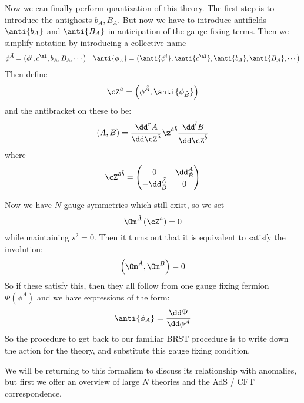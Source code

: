 \documentclass{booc}
\begin{document}
Now we can finally perform quantization of this theory.
The first step is to introduce the antighosts $b_A, B_A$. 
But now we have to introduce antifields $\anti{b_A}$ and $\anti{B_A}$
in anticipation of the gauge fixing terms. 
Then we simplify notation by introducing a collective name
\begin{align}
\phi^{\tilde{A}} = \left( \phi^i , c^\al , b_A , B_A, \cdots \right)
&&
\anti{\phi_{\tilde{A}}} = \left( \anti{\phi^i} , \anti{c^\al} , \anti{b_A} , \anti{B_A}, \cdots \right)
\end{align}
Then define
\begin{equation}
\cZ^{\tilde{a}} = \left( \phi^{\tilde{A}} , \anti{\phi_{\tilde{B}}} \right)
\end{equation}
and the antibracket on these to be:
\begin{equation}
\left( A,B \right) = 
\frac{\dd^r A}{\dd \cZ^{\tilde{a}}}
\z^{\tilde{a}\tilde{b}}\frac{\dd^l B}{\dd \cZ^{\tilde{b}}}
\end{equation}
where
\begin{equation}
\cZ^{\tilde{a}\tilde{b}} =
\begin{pmatrix}
0 & \dd^{\tilde{A}}_{\tilde{B}} \\
-\dd_{\tilde{B}}^{\tilde{A}} & 0
\end{pmatrix}
\end{equation}

Now we have $N$ gauge symmetries which still exist, so we set
\begin{equation}
\Om^{\tilde{A}}\left( \cZ^a \right) = 0
\end{equation}
while maintaining $s^2 = 0$. 
Then it turns out that it is equivalent to satisfy the involution:
\begin{equation}
\left( \Om^{\tilde{A}} , \Om^{\tilde{B}} \right) = 0
\end{equation}
So if these satisfy this, then they all follow from one gauge fixing fermion
$\Phi\left( \phi^A \right)$ and we have expressions of the form:
\begin{equation}
\anti{\phi_A} = 
\frac{\dd \Psi}{\dd \phi^A}
\end{equation}
So the procedure to get back to our familiar BRST procedure is to write down the action for the 
theory, and substitute this gauge fixing condition.

We will be returning to this formalism to discuss its relationship with anomalies, but
first we offer an overview of large $N$ theories
and the AdS / CFT correspondence. 
\end{document}
